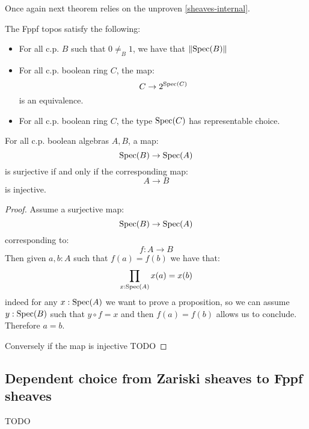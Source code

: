 Once again next theorem relies on the unproven \cref{sheaves-internal}.

\begin{theorem}
The Fppf topos satisfy the following:
\begin{itemize}
\item For all c.p. $B$ such that $0\not=_B1$, we have that $\lVert \operatorname{Spec}(B) \rVert$
\item For all c.p. boolean ring $C$, the map:
\[C\to 2^{\operatorname{Spec}(C)}\]
is an equivalence.
\item For all c.p. boolean ring $C$, the type $\operatorname{Spec}(C)$ has representable choice.
\end{itemize}
\end{theorem}

\begin{lemma}
For all c.p. boolean algebras $A,B$, a map:
\[\operatorname{Spec}(B)\to \operatorname{Spec}(A)\]
is surjective if and only if the corresponding map:
\[A\to B\]
is injective.
\end{lemma}

\begin{proof}
Assume a surjective map:
\[\operatorname{Spec}(B)\to \operatorname{Spec}(A)\]
corresponding to:
\[f:A\to B\]
Then given $a,b:A$ such that $f(a)=f(b)$ we have that:
\[\prod_{x:\operatorname{Spec}(A)} x(a) = x(b)\]
indeed for any $x:\operatorname{Spec}(A)$ we want to prove a proposition, so we can assume $y:\operatorname{Spec}(B)$ such that $y\circ f = x$ and then $f(a)=f(b)$ allows us to conclude. Therefore $a=b$.

Conversely if the map is injective TODO
\end{proof}


\subsection{Dependent choice from Zariski sheaves to Fppf sheaves}

TODO



